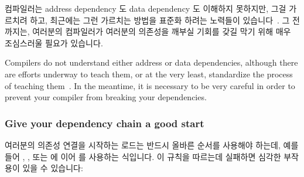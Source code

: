 컴파일러는 address dependency 도 data dependency 도 이해하지 못하지만, 그걸
가르치려 하고, 최근에는 그런 가르치는 방법을 표준화 하려는 노력들이
있습니다~\cite{PaulEMcKennneyConsumeP0190R0,PaulEMcKenney2017markconsumeP0462R1}.
그 전까지는, 여러분의 컴파일러가 여러분의 의존성을 깨부실 기회를 갖길 막기 위해
매우 조심스러울 필요가 있습니다.
\iffalse

Compilers do not understand either address or data dependencies,
although there are efforts underway to teach them, or at the very
least, standardize the process of teaching
them~\cite{PaulEMcKennneyConsumeP0190R4,PaulEMcKenney2017markconsumeP0462R1}.
In the meantime, it is necessary to be very careful in order to prevent
your compiler from breaking your dependencies.

\subsubsection{Give your dependency chain a good start}
여러분의 의존성 연결을 시작하는 로드는 반드시 올바른 순서를 사용해야 하는데,
예를 들어 , , 또는
 에 이어  를 사용하는 식입니다.
이 규칙을 따르는데 실패하면 심각한 부작용이 있을 수 있습니다:

